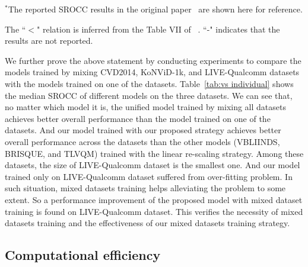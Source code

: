 \documentclass[twocolumn]{svjour3}          \smartqed  \usepackage{graphicx}
\begin{document}
\begin{table*}[!thb]
\begin{small}
    \vspace{1mm}
    
    $^*$The reported SROCC results in the original paper~\citep{korhonen2019two} are shown here for reference. 
    
    The ``$<$" relation is inferred from the Table VII of ~\citet{korhonen2019two}. ``-" indicates that the results are not reported.
    \end{small}
\end{table*}

We further prove the above statement by conducting experiments to compare the models trained by mixing CVD2014, KoNViD-1k, and LIVE-Qualcomm datasets with the models trained on one of the datasets. 
Table~\ref{tab:vs individual} shows the median SROCC of different models on the three datasets.
We can see that, no matter which model it is, the unified model trained by mixing all datasets achieves better overall performance than the model trained on one of the datasets.
And our model trained with our proposed strategy achieves better overall performance across the datasets than the other models (VBLIINDS, BRISQUE, and TLVQM) trained with the linear re-scaling strategy. 
Among these datasets, the size of LIVE-Qualcomm dataset is the smallest one. And our model trained only on LIVE-Qualcomm dataset suffered from over-fitting problem. In such situation, mixed datasets training helps alleviating the problem to some extent. So a performance improvement of the proposed model with mixed dataset training is found on LIVE-Qualcomm dataset.
This verifies the necessity of mixed datasets training and the effectiveness of our mixed datasets training strategy.

\subsection{Computational efficiency}
\end{document}
